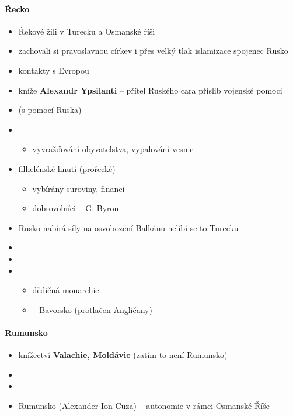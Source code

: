 \paragraph{Řecko}
\begin{itemize}
\item Řekové žili v Turecku a Osmanské říši
\item zachovali si pravoslavnou církev i přes velký tlak islamizace \ra spojenec Rusko
\item kontakty s Evropou
\item kníže \textbf{Alexandr Ypsilanti} -- přítel Ruského cara \ra příslib vojenské pomoci
\item {} (s pomocí Ruska)
\item {}
	\begin{itemize}
	\item vyvražďování obyvatelstva, vypalování vesnic
	\end{itemize}
\item filhelénské hnutí (prořecké) 
	\begin{itemize}
	\item vybírány suroviny, financí
	\item dobrovolníci -- G. Byron
	\end{itemize}
\item Rusko nabírá síly na osvobození Balkánu \ra nelíbí se to Turecku
\item {}
\item {}
\item {}
\begin{itemize}
\item {} \ra dědičná monarchie
\item {} -- Bavorsko (protlačen Angličany)
\end{itemize}
\end{itemize}

\paragraph{Rumunsko}
\begin{itemize}
\item knížectví \textbf{Valachie, Moldávie} (zatím to není Rumunsko)
\item {}
\item {}
\item {} \ra Rumunsko (Alexander Ion Cuza) -- autonomie v rámci Osmanské Říše
\end{itemize}

